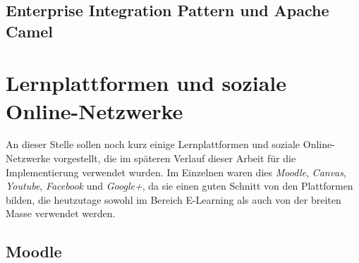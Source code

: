 
\subsection{Enterprise Integration Pattern und Apache Camel} %
\label{sub:enterprise_integration_pattern_und_apache_camel}




\section{Lernplattformen und soziale Online-Netzwerke} %
\label{sec:lernplattformen_und_soziale_online_netzwerke}

An dieser Stelle sollen noch kurz einige Lernplattformen und soziale Online-Netzwerke vorgestellt, die im späteren Verlauf dieser Arbeit für die Implementierung verwendet wurden. Im Einzelnen waren dies \emph{Moodle}, \emph{Canvas}, \emph{Youtube}, \emph{Facebook} und \emph{Google+}, da sie einen guten Schnitt von den Plattformen bilden, die heutzutage sowohl im Bereich E-Learning als auch von der breiten Masse verwendet werden.


\subsection{Moodle} %
\label{sub:moodle}

